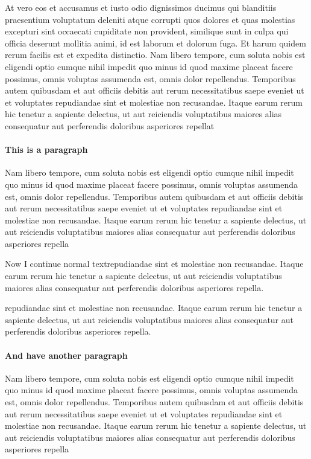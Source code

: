 \documentclass{article}
\begin{document}
At vero eos et accusamus et iusto odio dignissimos ducimus qui blanditiis praesentium voluptatum deleniti atque corrupti quos dolores et quas molestias excepturi sint occaecati cupiditate non provident, similique sunt in culpa qui officia deserunt mollitia animi, id est laborum et dolorum fuga. Et harum quidem rerum facilis est et expedita distinctio. Nam libero tempore, cum soluta nobis est eligendi optio cumque nihil impedit quo minus id quod maxime placeat facere possimus, omnis voluptas assumenda est, omnis dolor repellendus. Temporibus autem quibusdam et aut officiis debitis aut rerum necessitatibus saepe eveniet ut et voluptates repudiandae sint et molestiae non recusandae. Itaque earum rerum hic tenetur a sapiente delectus, ut aut reiciendis voluptatibus maiores alias consequatur aut perferendis doloribus asperiores repellat

\paragraph{This is a paragraph}
Nam libero tempore, cum soluta nobis est eligendi optio cumque nihil impedit quo minus id quod maxime placeat facere possimus, omnis voluptas assumenda est, omnis dolor repellendus. Temporibus autem quibusdam et aut officiis debitis aut rerum necessitatibus saepe eveniet ut et voluptates repudiandae sint et molestiae non recusandae. Itaque earum rerum hic tenetur a sapiente delectus, ut aut reiciendis voluptatibus maiores alias consequatur aut perferendis doloribus asperiores repella

Now I continue normal textrepudiandae sint et molestiae non recusandae. Itaque earum rerum hic tenetur a sapiente delectus, ut aut reiciendis voluptatibus maiores alias consequatur aut perferendis doloribus asperiores repella.

repudiandae sint et molestiae non recusandae. Itaque earum rerum hic tenetur a sapiente delectus, ut aut reiciendis voluptatibus maiores alias consequatur aut perferendis doloribus asperiores repella.

\paragraph{And have another paragraph}
Nam libero tempore, cum soluta nobis est eligendi optio cumque nihil impedit quo minus id quod maxime placeat facere possimus, omnis voluptas assumenda est, omnis dolor repellendus. Temporibus autem quibusdam et aut officiis debitis aut rerum necessitatibus saepe eveniet ut et voluptates repudiandae sint et molestiae non recusandae. Itaque earum rerum hic tenetur a sapiente delectus, ut aut reiciendis voluptatibus maiores alias consequatur aut perferendis doloribus asperiores repella
\end{document}

